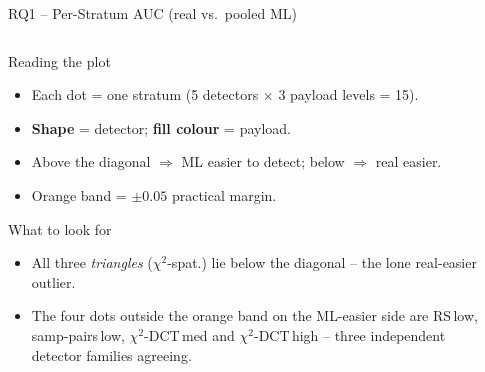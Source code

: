 \documentclass[aspectratio=169,11pt]{beamer}
\begin{document}
\begin{frame}{RQ1 -- Per-Stratum AUC (real vs.\ pooled ML)}
\scriptsize
\begin{columns}[T]
\begin{column}{0.42\textwidth}
\begin{block}{Reading the plot}
\begin{itemize}\setlength{\itemsep}{1pt}
\item Each dot = one stratum (5 detectors $\times$ 3 payload levels = 15).
\item \textbf{Shape} = detector; \textbf{fill colour} = payload.
\item Above the diagonal $\Rightarrow$ ML easier to detect;
   below $\Rightarrow$ real easier.
\item Orange band = $\pm 0.05$ practical margin.
\end{itemize}
\end{block}
\begin{exampleblock}{What to look for}
\begin{itemize}\setlength{\itemsep}{1pt}
\item All three \emph{triangles} ($\chi^2$-spat.) lie below the diagonal -- the lone real-easier outlier.
\item The four dots outside the orange band on the ML-easier side are RS\,low, samp-pairs\,low, $\chi^2$-DCT\,med and $\chi^2$-DCT\,high -- three independent detector families agreeing.
\end{itemize}
\end{exampleblock}
\end{column}
\begin{column}{0.54\textwidth}
\begin{center}
\begin{tikzpicture}[
  mCircle/.style ={circle, draw=umdark!65, inner sep=0pt, minimum size=4.8pt, line width=0.25pt},
  mSquare/.style ={rectangle, draw=umdark!65, inner sep=0pt, minimum size=4.2pt, line width=0.25pt},
  mDiamond/.style={diamond, draw=umdark!65, inner sep=0pt, minimum width=5.2pt, minimum height=5.2pt, line width=0.25pt},
  mTri/.style    ={regular polygon, regular polygon sides=3, draw=umdark!65, inner sep=0pt, minimum size=5.5pt, line width=0.25pt},
  mPenta/.style  ={regular polygon, regular polygon sides=5, draw=umdark!65, inner sep=0pt, minimum size=5pt, line width=0.25pt},
]

\end{tikzpicture}
\end{center}
\end{column}
\end{columns}
\end{frame}
\end{document}

